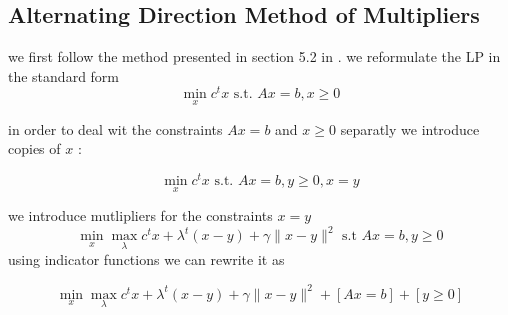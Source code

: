 \documentclass[11pt]{article}
\begin{document}
\subsection{Alternating Direction Method of Multipliers }

we first follow the method presented in section 5.2 in  \cite{Boyd2010}.
we reformulate the LP in the standard form 
\begin{equation}
\mathop{min}_x c^tx \text{ s.t. } Ax=b, x\geq 0
\end{equation}

in order to deal wit the constraints $Ax=b$ and $x\geq 0$ separatly we introduce copies of $x$ :

\begin{equation}
\mathop{min}_x c^tx \text{ s.t. } Ax=b, y\geq 0,x=y
\end{equation}

we introduce mutlipliers for the constraints $x=y$
\begin{equation}
\mathop{min}_x \mathop{max}_{\lambda} c^tx +\lambda^t (x-y)+\gamma\|x-y\|^2 \text{ s.t } Ax=b,y\geq 0
\end{equation}
using indicator functions we can rewrite it as 

\begin{equation}
\mathop{min}_x \mathop{max}_{\lambda} c^tx +\lambda^t (x-y)+\gamma\|x-y\|^2 + [Ax=b]+[y\geq 0]
\end{equation}
\end{document}
